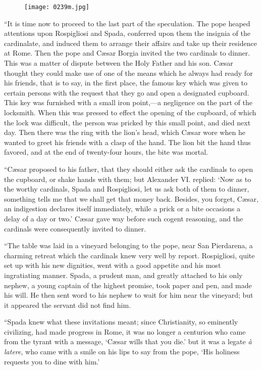 \begin{figure}[ht]
\texttt{[image: 0239m.jpg]}
\end{figure}

“It is time now to proceed to the last part of the speculation. The
pope heaped attentions upon Rospigliosi and Spada, conferred upon them
the insignia of the cardinalate, and induced them to arrange their
affairs and take up their residence at Rome. Then the pope and Cæsar
Borgia invited the two cardinals to dinner. This was a matter of
dispute between the Holy Father and his son. Cæsar thought they could
make use of one of the means which he always had ready for his friends,
that is to say, in the first place, the famous key which was given to
certain persons with the request that they go and open a designated
cupboard. This key was furnished with a small iron point,—a negligence
on the part of the locksmith. When this was pressed to effect the
opening of the cupboard, of which the lock was difficult, the person
was pricked by this small point, and died next day. Then there was the
ring with the lion’s head, which Cæsar wore when he wanted to greet his
friends with a clasp of the hand. The lion bit the hand thus favored,
and at the end of twenty-four hours, the bite was mortal.

“Cæsar proposed to his father, that they should either ask the
cardinals to open the cupboard, or shake hands with them; but Alexander
VI. replied: ‘Now as to the worthy cardinals, Spada and Rospigliosi,
let us ask both of them to dinner, something tells me that we shall get
that money back. Besides, you forget, Cæsar, an indigestion declares
itself immediately, while a prick or a bite occasions a delay of a day
or two.’ Cæsar gave way before such cogent reasoning, and the cardinals
were consequently invited to dinner.

“The table was laid in a vineyard belonging to the pope, near San
Pierdarena, a charming retreat which the cardinals knew very well by
report. Rospigliosi, quite set up with his new dignities, went with a
good appetite and his most ingratiating manner. Spada, a prudent man,
and greatly attached to his only nephew, a young captain of the highest
promise, took paper and pen, and made his will. He then sent word to
his nephew to wait for him near the vineyard; but it appeared the
servant did not find him.

“Spada knew what these invitations meant; since Christianity, so
eminently civilizing, had made progress in Rome, it was no longer a
centurion who came from the tyrant with a message, ‘Cæsar wills that
you die.’ but it was a legate \textit{à latere}, who came with a smile on his
lips to say from the pope, ‘His holiness requests you to dine with
him.’

